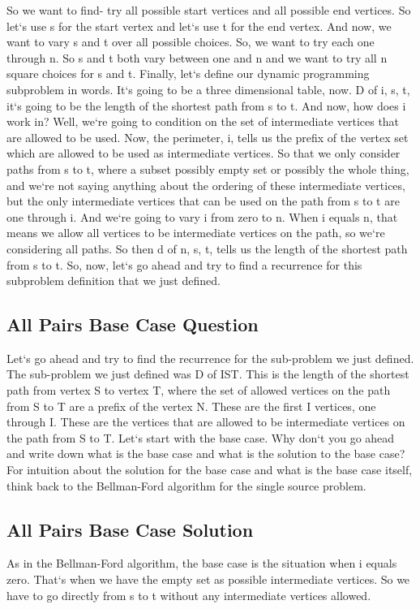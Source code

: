 So we want to find- try all possible start vertices and all possible end vertices.
So let`s use s for the start vertex and let`s use t for the end vertex.
And now, we want to vary s and t over all possible choices.
So, we want to try each one through n.
So s and t both vary between one and n and we want to try all n square choices for s and t.
Finally, let`s define our dynamic programming subproblem in words.
It`s going to be a three dimensional table, now.
D of i, s, t, it`s going to be the length of the shortest path from s to t.
And now, how does i work in? Well, we`re going to condition on the set of intermediate vertices that are allowed to be used.
Now, the perimeter, i, tells us the prefix of the vertex set which are allowed to be used as intermediate vertices.
So that we only consider paths from s to t, where a subset possibly empty set or possibly the whole thing, and we`re not saying anything about the ordering of these intermediate vertices, but the only intermediate vertices that can be used on the path from s to t are one through i.
And we`re going to vary i from zero to n.
When i equals n, that means we allow all vertices to be intermediate vertices on the path, so we`re considering all paths.
So then d of n, s, t, tells us the length of the shortest path from s to t.
So, now, let`s go ahead and try to find a recurrence for this subproblem definition that we just defined.

\subsection{All Pairs  Base Case Question}
Let`s go ahead and try to find the recurrence for the sub-problem we just defined.
The sub-problem we just defined was D of IST\@.
This is the length of the shortest path from vertex S to vertex T, where the set of allowed vertices on the path from S to T are a prefix of the vertex N\@.
These are the first I vertices, one through I\@.
These are the vertices that are allowed to be intermediate vertices on the path from S to T\@.
Let`s start with the base case.
Why don`t you go ahead and write down what is the base case and what is the solution to the base case? For intuition about the solution for the base case and what is the base case itself, think back to the Bellman-Ford algorithm for the single source problem.

\subsection{All Pairs  Base Case Solution}
As in the Bellman-Ford algorithm, the base case is the situation when i equals zero.
That`s when we have the empty set as possible intermediate vertices.
So we have to go directly from s to t without any intermediate vertices allowed.

